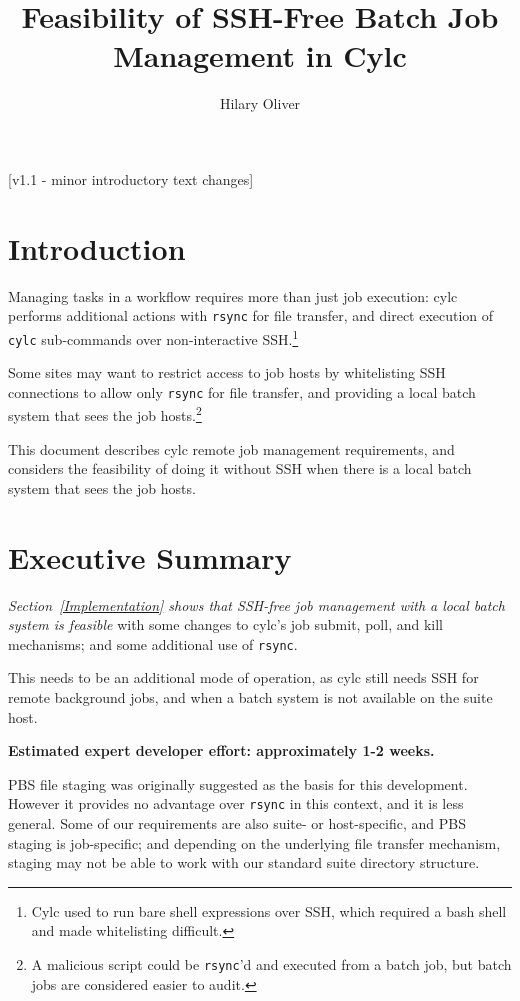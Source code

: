 \documentclass{article}
\title{Feasibility of SSH-Free Batch Job Management in Cylc}
\author{Hilary Oliver}
\begin{document}
\maketitle

[v1.1 - minor introductory text changes]

\section{Introduction}

Managing tasks in a workflow requires more than just job execution: cylc
performs additional actions with \lstinline=rsync= for file transfer, and
direct execution of \lstinline=cylc= sub-commands over non-interactive
SSH.\footnote{Cylc used to run bare shell expressions over SSH, which required
a bash shell and made whitelisting difficult.}

Some sites may want to restrict access to job hosts by whitelisting SSH
connections to allow only \lstinline=rsync= for file transfer, and providing a
local batch system that sees the job hosts.\footnote{A malicious script could
be \lstinline=rsync='d and executed from a batch job, but batch jobs are
considered easier to audit.}

This document describes cylc remote job management requirements, and considers
the feasibility of doing it without SSH when there is a local batch system that
sees the job hosts.

\section{Executive Summary}

{\em Section~\ref{Implementation} shows that SSH-free job management with a
local batch system is feasible} with some changes to cylc's job submit, poll,
and kill mechanisms; and some additional use of \lstinline=rsync=.

This needs to be an additional mode of operation, as cylc still needs
SSH for remote background jobs, and when a batch system is not available on
the suite host.

{\bf Estimated expert developer effort: approximately 1-2 weeks.}

PBS file staging was originally suggested as the basis for this development.
However it provides no advantage over \lstinline=rsync= in this context, and it
is less general. Some of our requirements are also suite- or host-specific, and
PBS staging is job-specific; and depending on the underlying file transfer
mechanism, staging may not be able to work with our standard suite directory
structure.
\end{document}
